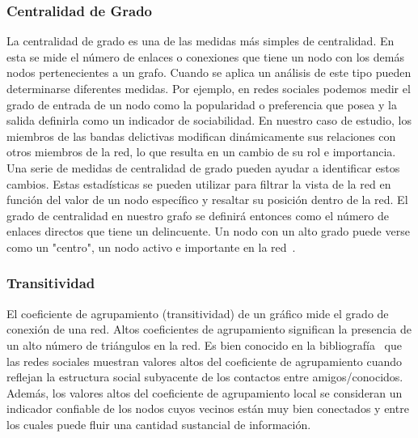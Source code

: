 \subsubsection{Centralidad de Grado} La centralidad de grado es una de las medidas más simples de centralidad. En esta se mide el número de enlaces o conexiones que tiene un nodo con los demás nodos pertenecientes a un grafo. Cuando se aplica un análisis de este tipo pueden determinarse diferentes medidas. Por ejemplo, en redes sociales podemos medir el grado de entrada de un nodo como la popularidad o preferencia que posea y la salida definirla como un indicador de sociabilidad. En nuestro caso de estudio, los miembros de las bandas delictivas modifican dinámicamente sus relaciones con otros miembros de la red, lo que resulta en un cambio de su rol e importancia. Una serie de medidas de centralidad de grado pueden ayudar a identificar estos cambios. Estas estadísticas se pueden utilizar para filtrar la vista de la red en función del valor de un nodo específico y resaltar su posición dentro de la red. El grado de centralidad en nuestro grafo se definirá entonces como el número de enlaces directos que tiene un delincuente. Un nodo con un alto grado puede verse como un "centro", un nodo activo e importante en la red~\cite{ref_article32}.

\subsubsection{Transitividad} El coeficiente de agrupamiento (transitividad) de un gráfico mide el grado de conexión de una red. Altos coeficientes de agrupamiento significan la presencia de un alto número de triángulos en la red. Es bien conocido en la bibliografía~\cite{ref_article34} que las redes sociales muestran valores altos del coeficiente de agrupamiento cuando reflejan la estructura social subyacente de los contactos entre amigos/conocidos. Además, los valores altos del coeficiente de agrupamiento local se consideran un indicador confiable de los nodos cuyos vecinos están muy bien conectados y entre los cuales puede fluir una cantidad sustancial de información.
